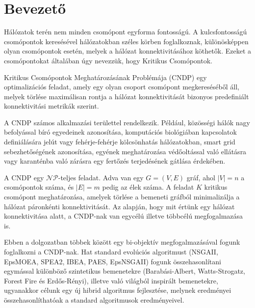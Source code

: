 \chapter{Bevezető}\label{ch:BEVEZETO}

Hálózatok terén nem minden csomópont egyforma fontosságú.
A kulcsfontosságú csomópontok keresésével hálózatokban széles körben foglalkoznak,
különösképpen olyan csomópontok esetén, melyek a hálózat konnektivitásához köthetők.
Ezeket a csomópontokat általában úgy nevezzük, hogy Kritikus Csomópontok.

Kritikus Csomópontok Meghatározásának Problémája (CNDP)
egy optimalizációs feladat, amely egy olyan csoport csomópont
megkereséséből áll, melyek törlése maximálisan rontja a hálózat
konnektivitását bizonyos predefiniált konnektivitási metrikák szerint.

A CNDP számos alkalmazási területtel rendelkezik.
Például, közösségi hálók nagy befolyással bíró egyedeinek azonosítása,
komputációs biológiában kapcsolatok definiálására jelút
vagy fehérje-fehérje kölcsönhatás hálózatokban,
smart grid sebezhetőségének azonosítása, egyének meghatározása
védőoltással való ellátásra vagy karanténba való zárásra egy
fertőzés terjedésének gátlása érdekében.

A CNDP egy $\mathcal{N}\mathcal{P}$-teljes feladat. Adva van egy $G = (V, E)$ gráf, ahol $|V| = n$ a csomópontok száma,
és $|E| = m$ pedig az élek száma. A feladat $K$ kritikus csomópont meghatározása, amelyek törlése a bemeneti
gráfból minimalizálja a hálózat páronkénti konnektivitását. Az alapján, hogy mit értünk egy hálózat
konnektivitása alatt, a CNDP-nak van egycélú illetve többcélú megfogalmazása is.

Ebben a dolgozatban többek között egy bi-objektív megfogalmazásával fogunk foglalkozni a CNDP-nak.
Hat standard evolúciós algoritmust (NSGAII, EpsMOEA, SPEA2, IBEA, PAES, EpsNSGAII) fogunk összehasonlítani
egymással különböző szintetikus bemenetekre (Barabási-Albert, Watts-Strogatz, Forest Fire és Erdős-Rényi),
illetve való világból inspirált bemenetekre, ugyanakkor célunk egy új hibrid algoritmus fejlesztése,
melynek eredményei összehasonlíthatóak a standard algoritmusok eredményeivel.



